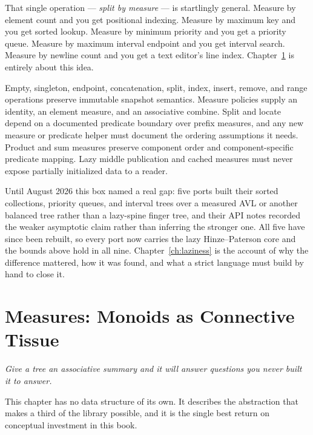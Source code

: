 \documentclass[11pt,twoside,openright]{book}
\newcommand{\term}[1]{\textit{#1}}
\newcommand{\motto}[1]{%
  \begingroup
  \vspace{-4pt}\hfill\begin{minipage}{0.80\textwidth}
    \raggedleft\itshape\color{d7slate}\small #1\par
  \end{minipage}\par\vspace{18pt}
  \endgroup}
\begin{document}
That single operation --- \term{split by measure} --- is startlingly general.
Measure by element count and you get positional indexing. Measure by maximum key
and you get sorted lookup. Measure by minimum priority and you get a priority
queue. Measure by maximum interval endpoint and you get interval search. Measure
by newline count and you get a text editor's line index. Chapter~\ref{ch:measures}
is entirely about this idea.

\begin{contractbox}
Empty, singleton, endpoint, concatenation, split, index, insert, remove, and
range operations preserve immutable snapshot semantics. Measure policies supply
an identity, an element measure, and an associative combine. Split and locate
depend on a documented predicate boundary over prefix measures, and any new
measure or predicate helper must document the ordering assumptions it needs.
Product and sum measures preserve component order and component-specific
predicate mapping. Lazy middle publication and cached measures must never expose
partially initialized data to a reader.
\end{contractbox}

\begin{caveatbox}
Until August 2026 this box named a real gap: five ports built their sorted
collections, priority queues, and interval trees over a measured AVL or another
balanced tree rather than a lazy-spine finger tree, and their API notes recorded
the weaker asymptotic claim rather than inferring the stronger one. All five have
since been rebuilt, so every port now carries the lazy Hinze--Paterson core and
the bounds above hold in all nine. Chapter~\ref{ch:laziness} is the account of
why the difference mattered, how it was found, and what a strict language must
build by hand to close it.
\end{caveatbox}

\chapter{Measures: Monoids as Connective Tissue}
\label{ch:measures}

\motto{Give a tree an associative summary and it will answer questions you never
built it to answer.}

\noindent
This chapter has no data structure of its own. It describes the abstraction that
makes a third of the library possible, and it is the single best return on
conceptual investment in this book.
\end{document}
